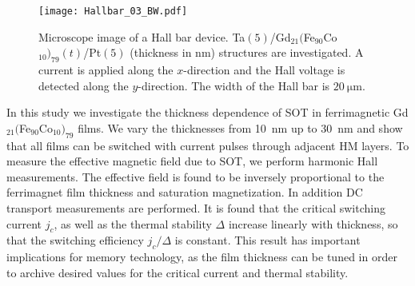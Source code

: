 \documentclass[aps,prb,superscriptaddress,sd,reprint]{revtex4-1}
\newcommand{\GdFeCo}{Gd$_{21}($Fe$_{90}$Co$_{10})_{79}$ }
\begin{document}
%
%
\begin{figure}[b]
\begin{center}
\texttt{[image: Hallbar\_03\_BW.pdf]}
\caption{\label{fig:Hallbar} Microscope image of a Hall bar device. Ta$(5)$/Gd$_{21}($Fe$_{90}$Co$_{10})_{79}(t)$/Pt$(5)$ (thickness in $\si{\nano\meter}$) structures are investigated. A current is applied along the $x$-direction and the Hall voltage is detected along the $y$-direction. The width of the Hall bar is $\SI{20}{\micro\meter}$.}
\end{center}
\end{figure}
%
%
In this study we investigate the thickness dependence of SOT in ferrimagnetic \GdFeCo films. We vary the thicknesses from \SI{10}{\nano\meter} up to \SI{30}{\nano\meter} and show that all films can be switched with current pulses through adjacent HM layers. To measure the effective magnetic field due to SOT, we perform harmonic Hall measurements. The effective field is found to be inversely proportional to the ferrimagnet film thickness and saturation magnetization. In addition DC transport measurements are performed. It is found that the critical switching current $j_c$, as well as the thermal stability $\Delta$ increase linearly with thickness, so that the switching efficiency $j_c/\Delta$ is constant. This result has important implications for memory technology, as the film thickness can be tuned in order to archive desired values for the critical current and thermal stability.
\end{document}
